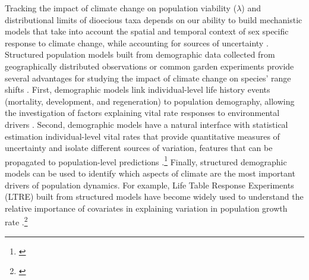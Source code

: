 \documentclass[12pt]{article}\usepackage[]{graphicx}\usepackage[dvipsnames]{xcolor}
\newcommand{\tom}[2]{{\color{red}{#1}}\footnote{\textit{\color{red}{#2}}}}
\newcommand{\jacob}[2]{{\color{blue}{#1}}\footnote{\textit{\color{blue}{#2}}}}
\begin{document}
Tracking the impact of climate change on  population viability ($\lambda$) and distributional limits of dioecious taxa depends on our ability to build mechanistic models that take into account the spatial and temporal context of sex specific response to climate change, while accounting for sources of uncertainty \citep{davis2001range,evans2016towards,czachura2020demographic}.
Structured population models built from demographic data collected from geographically distributed observations or common garden experiments provide several advantages for studying the impact of climate change on species' range shifts \citep{merow2017climate,schwinning2022common,schultz2022climate}.
First, demographic models link individual-level life history events (mortality, development, and regeneration) to population demography, allowing the investigation of factors explaining vital rate responses to environmental drivers \citep{ehrlen2015predicting,louthan2022climate,dahlgren2016demography}. 
Second, demographic models have a natural interface with %
statistical estimation individual-level vital rates that provide quantitative measures of uncertainty and isolate different sources of variation, features that can be propagated to population-level predictions \citep{elderd2016quantifying}.\tom{}{I cut the sentence about experiments because I don't think our data really exemplify this. While we did do an experiment, we did not manipulate climate, so we are subject to the same correlations as observational studies.}
Finally, structured demographic models can be used to identify which aspects of climate are the most important drivers of population dynamics.
For example, Life Table Response Experiments (LTRE) built from structured models have become widely used to understand the relative importance of covariates in explaining variation in population growth rate  \citep{ellner2016data,hernandez2023exact}.\tom{}{I think LTRE is a relatively small part of the paper so I suggested reducing the amount of text on it here.}
\end{document}
